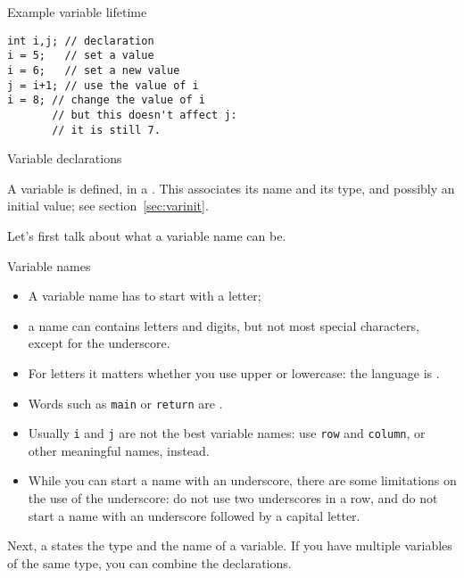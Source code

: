 \begin{block}{Example variable lifetime}
  \label{sl:varlife}
\begin{lstlisting}
int i,j; // declaration
i = 5;   // set a value
i = 6;   // set a new value
j = i+1; // use the value of i
i = 8; // change the value of i
       // but this doesn't affect j:
       // it is still 7.
\end{lstlisting}
\end{block}

 {Variable declarations}

A variable is defined,
in a .
This associates its name and its type,
and possibly an initial value; see section~\ref{sec:varinit}.

Let's first talk about what a variable name can be.

\begin{block}{Variable names}
  \label{sl:varname}
  \begin{itemize}
  \item
    A variable name has to start with a letter;
  \item a name can contains letters and  digits,
    but not most special characters, except for the underscore.
  \item For letters it matters
    whether you use upper or lowercase: the language is .
  \item Words such as \lstinline{main} or \lstinline{return} are .
  \item Usually \lstinline{i} and \lstinline{j} are not the best variable names: use
    \lstinline{row} and \lstinline{column}, or other meaningful names, instead.
  \item While you can start a name with an underscore,
    there are some limitations on the use of the underscore:
    do not use two underscores in a row, and
    do not start a name with an underscore followed by a capital letter.
  \end{itemize}
\end{block}


Next, a 
states the type and the name of a variable.
If you have multiple variables of the same type,
you can combine the declarations.

